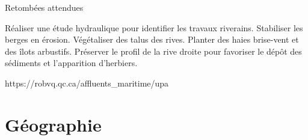 \documentclass[12pt]{report}
\begin{document}
Retombées attendues

    Réaliser une étude hydraulique pour identifier les travaux riverains.
    Stabiliser les berges en érosion.
    Végétaliser des talus des rives.
    Planter des haies brise-vent et des îlots arbustifs.
    Préserver le profil de la rive droite pour favoriser le dépôt des sédiments et l’apparition d’herbiers.




https://robvq.qc.ca/affluents_maritime/upa

\section{Géographie}
\end{document}
